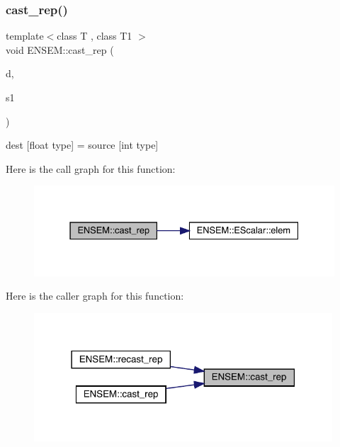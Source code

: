 \subsubsection{\texorpdfstring{cast\_rep()}{cast\_rep()}}
{\footnotesize\ttfamily template$<$class T , class T1 $>$ \\
void E\+N\+S\+E\+M\+::cast\+\_\+rep (\begin{DoxyParamCaption}\item[{T \&}]{d,  }\item[{const \mbox{\hyperlink{classENSEM_1_1EScalar}{E\+Scalar}}$<$ T1 $>$ \&}]{s1 }\end{DoxyParamCaption})\hspace{0.3cm}{\ttfamily [inline]}}



dest \mbox{[}float type\mbox{]} = source \mbox{[}int type\mbox{]} 

Here is the call graph for this function\+:
\nopagebreak
\begin{figure}[H]
\begin{center}
\leavevmode
\includegraphics[width=331pt]{d4/dca/group__escalar_ga1fe36c2ff072b322fac723a4e44f6584_cgraph}
\end{center}
\end{figure}
Here is the caller graph for this function\+:
\nopagebreak
\begin{figure}[H]
\begin{center}
\leavevmode
\includegraphics[width=316pt]{d4/dca/group__escalar_ga1fe36c2ff072b322fac723a4e44f6584_icgraph}
\end{center}
\end{figure}
\mbox{\label{group__escalar_gaccbb7d66b912e8f0972f4e50095f296e}} 
